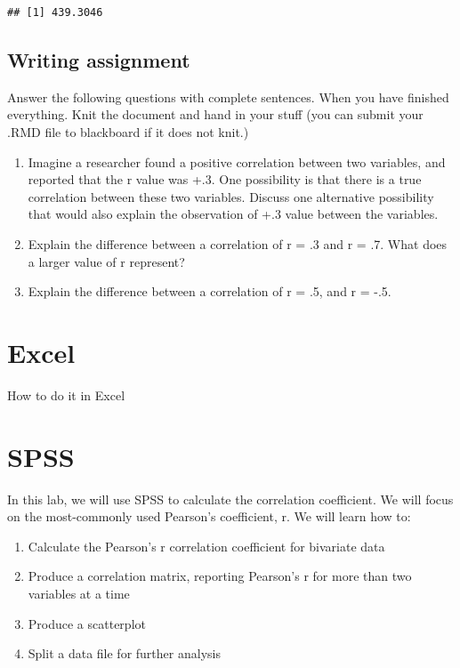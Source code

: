 \documentclass[
]{book}
\providecommand{\tightlist}{%
  \setlength{\itemsep}{0pt}\setlength{\parskip}{0pt}}
\begin{document}
\begin{verbatim}
## [1] 439.3046
\end{verbatim}

\hypertarget{writing-assignment-2}{%
\subsection{Writing assignment}\label{writing-assignment-2}}

Answer the following questions with complete sentences. When you have finished everything. Knit the document and hand in your stuff (you can submit your .RMD file to blackboard if it does not knit.)

\begin{enumerate}
\def\labelenumi{\arabic{enumi}.}
\item
  Imagine a researcher found a positive correlation between two variables, and reported that the r value was +.3. One possibility is that there is a true correlation between these two variables. Discuss one alternative possibility that would also explain the observation of +.3 value between the variables.
\item
  Explain the difference between a correlation of r = .3 and r = .7. What does a larger value of r represent?
\item
  Explain the difference between a correlation of r = .5, and r = -.5.
\end{enumerate}

\hypertarget{excel-3}{%
\section{Excel}\label{excel-3}}

How to do it in Excel

\hypertarget{spss-3}{%
\section{SPSS}\label{spss-3}}

In this lab, we will use SPSS to calculate the correlation coefficient. We will focus on the most-commonly used Pearson's coefficient, r. We will learn how to:

\begin{enumerate}
\def\labelenumi{\arabic{enumi}.}
\tightlist
\item
  Calculate the Pearson's r correlation coefficient for bivariate data
\item
  Produce a correlation matrix, reporting Pearson's r for more than two variables at a time
\item
  Produce a scatterplot
\item
  Split a data file for further analysis
\end{enumerate}
\end{document}
